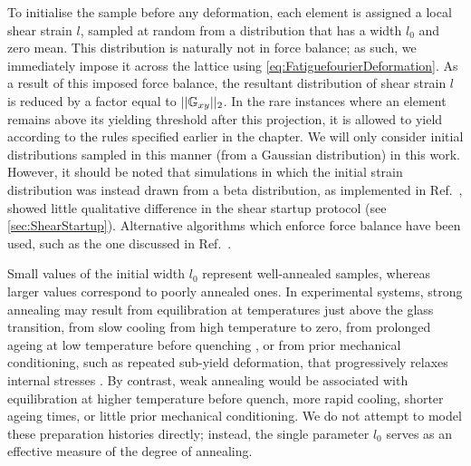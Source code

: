 To initialise the sample before any deformation, each element is assigned a local shear strain $l$, sampled at random from a distribution that has a width $l_0$ and zero mean. This distribution is naturally not in force balance; as such, we immediately impose it across the lattice using \cref{eq:FatiguefourierDeformation}. As a result of this imposed force balance, the resultant distribution of shear strain $l$ is reduced by a factor equal to $||\mathbb{G}_{xy}||_2$. In the rare instances where an element remains above its yielding threshold after this projection, it is allowed to yield according to the rules specified earlier in the chapter. We will only consider initial distributions sampled in this manner (from a Gaussian distribution) in this work. However, it should be noted that simulations in which the initial strain distribution was instead drawn from a beta distribution, as implemented in Ref.~\cite{pollard_yielding_2022}, showed little qualitative difference in the shear startup protocol (see \cref{sec:ShearStartup}). Alternative algorithms which enforce force balance have been used, such as the one discussed in Ref.~\cite{Popovi2018}.

Small values of the initial width $l_0$ represent well-annealed samples, whereas larger values correspond to poorly annealed ones. In experimental systems, strong annealing may result from equilibration at temperatures just above the glass transition, from slow cooling from high temperature to zero, from prolonged ageing at low temperature before quenching \cite{yehGlassStabilityChanges2020,kumarMappingOutGlassy2022,mfielding_shear_2009,cochran_slow_2024}, or from prior mechanical conditioning, such as repeated sub-yield deformation, that progressively relaxes internal stresses \cite{bhaumikRoleAnnealingDetermining2021,priezjevMolecularDynamicsSimulations2018,khandareElastoplasticModellingCyclic2026}. By contrast, weak annealing would be associated with equilibration at higher temperature before quench, more rapid cooling, shorter ageing times, or little prior mechanical conditioning. We do not attempt to model these preparation histories directly; instead, the single parameter $l_0$ serves as an effective measure of the degree of annealing.

